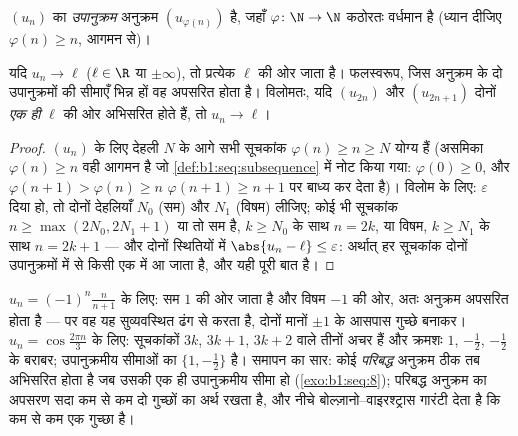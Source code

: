 \begin{definition}[उपानुक्रम]\label{def:b1:seq:subsequence}
$(u_n)$ का \emph{उपानुक्रम} अनुक्रम $(u_{\varphi(n)})$ है,
जहाँ $\varphi \colon \N \to \N$ कठोरतः वर्धमान है (ध्यान दीजिए $\varphi(n)
\geq n$, आगमन से)।
\end{definition}

\begin{proposition}\label{prop:b1:seq:subsequences}
यदि $u_n \to \ell$ ($\ell \in \R$ या $\pm\infty$), तो प्रत्येक 
$\ell$ की ओर जाता है। फलस्वरूप, जिस अनुक्रम के दो उपानुक्रमों की सीमाएँ
भिन्न हों वह अपसरित होता है। विलोमतः, यदि $(u_{2n})$ और $(u_{2n+1})$ दोनों
\emph{एक ही} $\ell$ की ओर अभिसरित होते हैं, तो $u_n \to \ell$।
\end{proposition}

\begin{proof}
$(u_n)$ के लिए देहली $N$ के आगे सभी सूचकांक $\varphi(n) \geq n \geq N$ योग्य
हैं (असमिका $\varphi(n) \geq n$ वही आगमन है जो \cref{def:b1:seq:subsequence}
में नोट किया गया: $\varphi(0) \geq 0$, और $\varphi(n+1) > \varphi(n) \geq n$
$\varphi(n+1) \geq n + 1$ पर बाध्य कर देता है)। विलोम के लिए: $\varepsilon$
दिया हो, तो दोनों देहलियाँ $N_0$ (सम) और $N_1$ (विषम) लीजिए; कोई भी सूचकांक
$n \geq \max(2N_0, 2N_1 + 1)$ या तो सम है, $k \geq N_0$ के साथ $n = 2k$, या
विषम, $k \geq N_1$ के साथ $n = 2k+1$ --- और दोनों स्थितियों में $\abs{u_n -
\ell} \leq \varepsilon$: अर्थात् हर सूचकांक दोनों उपानुक्रमों में से किसी एक
में आ जाता है, और यही पूरी बात है।
\end{proof}

\begin{example}[उपानुक्रमीय सीमाएँ]\label{ex:b1:seq:sublimits}
$u_n = (-1)^n \frac{n}{n+1}$ के लिए: सम  $1$ की ओर जाता है और विषम
$-1$ की ओर, अतः अनुक्रम अपसरित होता है --- पर वह यह सुव्यवस्थित ढंग से करता
है, दोनों मानों $\pm 1$ के आसपास गुच्छे बनाकर। $u_n = \cos\frac{2\pi n}{3}$
के लिए: सूचकांकों $3k$, $3k + 1$, $3k + 2$ वाले तीनों  अचर हैं और
क्रमशः $1$, $-\frac12$, $-\frac12$ के बराबर; उपानुक्रमीय सीमाओं का 
$\{1, -\frac12\}$ है। समापन का सार: कोई \emph{परिबद्ध} अनुक्रम ठीक तब
अभिसरित होता है जब उसकी एक ही उपानुक्रमीय सीमा हो (\cref{exo:b1:seq:8});
परिबद्ध अनुक्रम का अपसरण सदा कम से कम दो गुच्छों का अर्थ रखता है, और नीचे
बोल्ज़ानो--वाइरश्ट्रास गारंटी देता है कि कम से कम एक गुच्छा है।
\end{example}

